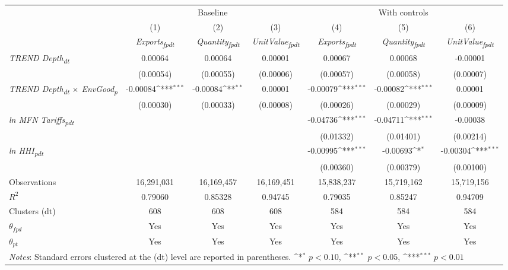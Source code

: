 {
\def\sym#1{\ifmmode^{#1}\else\(^{#1}\)\fi}
\begin{tabular}{l*{6}{c}}
\toprule
&\multicolumn{3}{c}{Baseline}&\multicolumn{3}{c}{With controls}\\\cmidrule(lr){2-4}\cmidrule(lr){5-7}
&(1)&(2)&(3)&(4)&(5)&(6)\\
&\textit{Exports\textsubscript{fpdt}}&\textit{Quantity\textsubscript{fpdt}}&\textit{UnitValue\textsubscript{fpdt}}&\textit{Exports\textsubscript{fpdt}}&\textit{Quantity\textsubscript{fpdt}}&\textit{UnitValue\textsubscript{fpdt}}\\
\midrule
\textit{TREND Depth\textsubscript{dt}} & 0.00064 & 0.00064 & 0.00001 & 0.00067 & 0.00068 & -0.00001\\
 & (0.00054) & (0.00055) & (0.00006) & (0.00057) & (0.00058) & (0.00007)\\
\addlinespace
\textit{TREND Depth\textsubscript{dt} $\times$ EnvGood\textsubscript{p}} & -0.00084\sym{***} & -0.00084\sym{**} & 0.00001 & -0.00079\sym{***} & -0.00082\sym{***} & 0.00001\\
 & (0.00030) & (0.00033) & (0.00008) & (0.00026) & (0.00029) & (0.00009)\\
\addlinespace
\textit{ln MFN Tariffs\textsubscript{pdt}} &  &  &  & -0.04736\sym{***} & -0.04711\sym{***} & -0.00038\\
 &  &  &  & (0.01332) & (0.01401) & (0.00214)\\
\addlinespace
\textit{ln HHI\textsubscript{pdt}} &  &  &  & -0.00995\sym{***} & -0.00693\sym{*} & -0.00304\sym{***}\\
 &  &  &  & (0.00360) & (0.00379) & (0.00100)\\
\midrule
Observations & 16,291,031 & 16,169,457 & 16,169,451 & 15,838,237 & 15,719,162 & 15,719,156\\
$R^{2}$ & 0.79060 & 0.85328 & 0.94745 & 0.79035 & 0.85247 & 0.94709\\
Clusters (dt) & 608 & 608 & 608 & 584 & 584 & 584\\
$\theta_{fpd}$ & Yes & Yes & Yes & Yes & Yes & Yes\\
$\theta_{pt}$ & Yes & Yes & Yes & Yes & Yes & Yes\\
\bottomrule
\multicolumn{7}{l}{\footnotesize \textit{Notes}: Standard errors clustered at the (dt) level are reported in parentheses. \sym{*} \(p<0.10\), \sym{**} \(p<0.05\), \sym{***} \(p<0.01\)}\\
\end{tabular}
}

